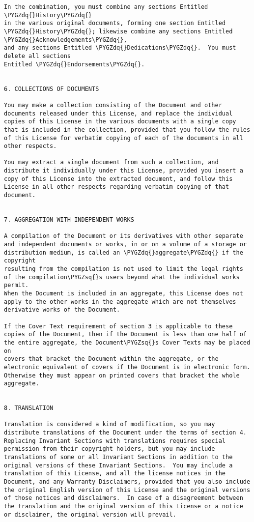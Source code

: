 \documentclass[letterpaper,10pt,english]{sphinxmanual}
\def\PYGZsq{\char`\'}
\def\PYGZdq{\char`\"}
\renewcommand\PYGZsq{\textquotesingle}
\begin{document}
\begin{Verbatim}[frame=single,commandchars=\\\{\}]
In the combination, you must combine any sections Entitled \PYGZdq{}History\PYGZdq{}
in the various original documents, forming one section Entitled
\PYGZdq{}History\PYGZdq{}; likewise combine any sections Entitled \PYGZdq{}Acknowledgements\PYGZdq{},
and any sections Entitled \PYGZdq{}Dedications\PYGZdq{}.  You must delete all sections
Entitled \PYGZdq{}Endorsements\PYGZdq{}.


6. COLLECTIONS OF DOCUMENTS

You may make a collection consisting of the Document and other
documents released under this License, and replace the individual
copies of this License in the various documents with a single copy
that is included in the collection, provided that you follow the rules
of this License for verbatim copying of each of the documents in all
other respects.

You may extract a single document from such a collection, and
distribute it individually under this License, provided you insert a
copy of this License into the extracted document, and follow this
License in all other respects regarding verbatim copying of that
document.


7. AGGREGATION WITH INDEPENDENT WORKS

A compilation of the Document or its derivatives with other separate
and independent documents or works, in or on a volume of a storage or
distribution medium, is called an \PYGZdq{}aggregate\PYGZdq{} if the copyright
resulting from the compilation is not used to limit the legal rights
of the compilation\PYGZsq{}s users beyond what the individual works permit.
When the Document is included in an aggregate, this License does not
apply to the other works in the aggregate which are not themselves
derivative works of the Document.

If the Cover Text requirement of section 3 is applicable to these
copies of the Document, then if the Document is less than one half of
the entire aggregate, the Document\PYGZsq{}s Cover Texts may be placed on
covers that bracket the Document within the aggregate, or the
electronic equivalent of covers if the Document is in electronic form.
Otherwise they must appear on printed covers that bracket the whole
aggregate.


8. TRANSLATION

Translation is considered a kind of modification, so you may
distribute translations of the Document under the terms of section 4.
Replacing Invariant Sections with translations requires special
permission from their copyright holders, but you may include
translations of some or all Invariant Sections in addition to the
original versions of these Invariant Sections.  You may include a
translation of this License, and all the license notices in the
Document, and any Warranty Disclaimers, provided that you also include
the original English version of this License and the original versions
of those notices and disclaimers.  In case of a disagreement between
the translation and the original version of this License or a notice
or disclaimer, the original version will prevail.


\end{Verbatim}
\end{document}
